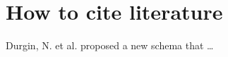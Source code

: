 \documentclass[]{article}
\begin{document}
\section{How to cite literature}
Durgin, N. et al. \cite{durgin_undecidability_1999} proposed a new schema that \dots 


\end{document}

